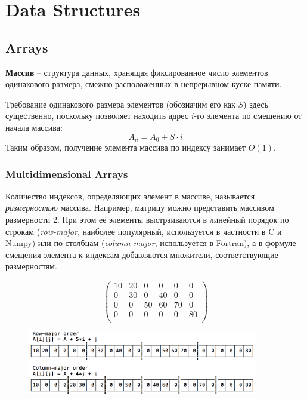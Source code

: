 \documentclass[12pt,a4paper]{report}
\begin{document}
\chapter*{Data Structures}

\section*{Arrays}

{\bf Массив} -- структура данных, хранящая фиксированное число элементов одинакового размера, смежно расположенных в непрерывном куске памяти.

Требование одинакового размера элементов (обозначим его как $S$) здесь существенно, поскольку позволяет находить адрес $i$-го элемента по смещению от начала массива:
$$A_n = A_0 + S \cdot i$$
Таким образом, получение элемента массива по индексу занимает $O(1)$. 

\subsection*{Multidimensional Arrays}

Количество индексов, определяющих элемент в массиве, называется {\em размерностью} массива. Например, матрицу можно представить массивом размерности 2. При этом её элементы выстраиваются в линейный порядок по строкам ({\em row-major}, наиболее популярный, используется в частности в C и Numpy) или по столбцам ({\em column-major}, используется в Fortran), а в формуле смещения элемента к индексам добавляются множители, соответствующие размерностям.

$$
\begin{pmatrix}
10 & 20 &  0 &  0 &  0 &  0 \\
 0 & 30 &  0 & 40 &  0 &  0 \\
 0 &  0 & 50 & 60 & 70 &  0 \\
 0 &  0 &  0 &  0 &  0 & 80 \\
\end{pmatrix}
$$

\begin{figure}[!ht]
\centering
\includegraphics[width=10cm]{matrix.png}
\end{figure}
\end{document}
